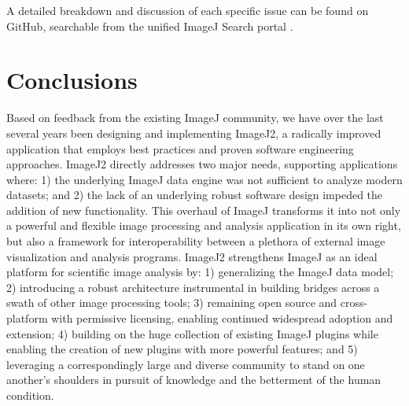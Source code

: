 \documentclass{bmcart}
\begin{document}
A detailed breakdown and discussion of each specific issue can be found on
GitHub, searchable from the unified ImageJ Search portal \cite{imagej_search}.


\section*{Conclusions}
Based on feedback from the existing ImageJ community, we have over the last
several years been designing and implementing ImageJ2, a radically improved
application that employs best practices and proven software engineering
approaches. ImageJ2 directly addresses two major needs, supporting applications
where: 1) the underlying ImageJ data engine was not sufficient to analyze
modern datasets; and 2) the lack of an underlying robust software design
impeded the addition of new functionality. This overhaul of ImageJ transforms
it into not only a powerful and flexible image processing and analysis
application in its own right, but also a framework for interoperability between
a plethora of external image visualization and analysis programs. ImageJ2
strengthens ImageJ as an ideal platform for scientific image analysis by: 1)
generalizing the ImageJ data model; 2) introducing a robust architecture
instrumental in building bridges across a swath of other image processing
tools; 3) remaining open source and cross-platform with permissive licensing,
enabling continued widespread adoption and extension; 4) building on the huge
collection of existing ImageJ plugins while enabling the creation of new
plugins with more powerful features; and 5) leveraging a correspondingly large
and diverse community to stand on one another's shoulders in pursuit of
knowledge and the betterment of the human condition.


\printglossary[title=List of abbreviations,type=\acronymtype,style=long]

\end{document}
